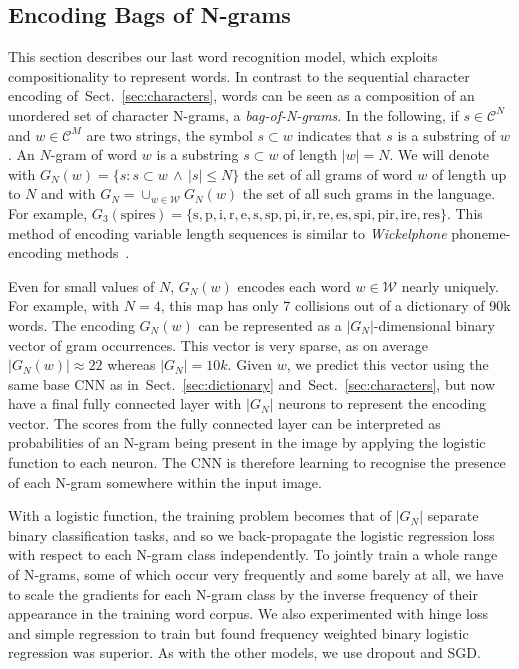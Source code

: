 \documentclass{article} \usepackage{nips14submit_e,times}
\newcommand{\sref}[1]{Sect.~\ref{#1}}
\newcommand{\dict}{\mathcal{W}}
\newcommand{\chars}{\mathcal{C}}
\renewcommand{\paragraph}[1]{\par\noindent{\bf #1}}
\begin{document}
\subsection{Encoding Bags of N-grams}\label{sec:ngrams}
This section describes our last word recognition model, which exploits
compositionality to represent words. In contrast to the sequential
character encoding of~\sref{sec:characters}, words can be seen as a
composition of an unordered set of character N-grams, a
\emph{bag-of-N-grams}. In the following, if $s\in \chars^N$ and
$w\in\chars^M$ are two strings, the symbol $s \subset w$ indicates
that $s$ is a substring
of $w$. An $N$-gram
of word $w$ is a substring $s \subset w$ of length $|w|=N$. We will
denote with $G_N(w) = \{ s : s\subset w \,\wedge\,|s|\leq N\}$ the set
of all grams of word $w$ of length up to $N$ and with $G_N
=\cup_{w\in\dict} G_N(w)$ the set of all such grams in the
language. For example,
$G_3(\text{spires})=\{\text{s},\text{p},\text{i},\text{r},\text{e},\text{s},\text{sp},\text{pi},\text{ir},\text{re},\text{es},\text{spi},\text{pir},\text{ire},\text{res}\}$. This method of encoding variable length sequences is similar to \emph{Wickelphone} phoneme-encoding methods~\cite{Wickelgran69}.

Even for small values of $N$, $G_N(w)$ encodes each word $w\in\mathcal{W}$ nearly uniquely. For example, with $N=4$, this map has only 7 collisions out of a dictionary of 90k words. The encoding $G_N(w)$ can be represented as a $|G_N|$-dimensional binary vector of gram occurrences. This vector is very sparse, as on average $|G_N(w)|\approx 22$ whereas $|G_N|=10k$. Given $w$, we predict this vector using the same base CNN as in~\sref{sec:dictionary} and~\sref{sec:characters}, but now have a final fully connected layer with $|G_N|$ neurons to represent the encoding vector. The scores from the fully connected layer can be interpreted as probabilities of an N-gram being present in the image by applying the logistic function to each neuron. The CNN is therefore learning to recognise the presence of each N-gram somewhere within the input image.

\paragraph{Training.}
With a logistic function, the training problem becomes that of $|G_N|$ separate binary classification tasks, and so we back-propagate the logistic regression loss with respect to each N-gram class independently. To jointly train a whole range of N-grams, some of which occur very frequently and some barely at all, we have to scale the gradients for each N-gram class by the inverse frequency of their appearance in the training word corpus. We also experimented with hinge loss and simple regression to train but found frequency weighted binary logistic regression was superior. As with the other models, we use dropout and SGD.
\end{document}

